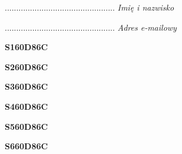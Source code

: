 \begin{turn}{90}\begin{minipage}{\linewidth} \vspace{20mm} ................................................  \textit{Imię i nazwisko}\end{minipage}\end{turn}

\begin{turn}{90}\begin{minipage}{\linewidth} \vspace{20mm} ................................................  \textit{Adres e-mailowy}\end{minipage}\end{turn}

\begin{turn}{90}\huge \begin{minipage}{\linewidth} \vspace{10mm}\textbf{S160D86C}\end{minipage}\end{turn}

\begin{turn}{90}\huge \begin{minipage}{\linewidth} \vspace{10mm}\textbf{S260D86C}\end{minipage}\end{turn}

\begin{turn}{90}\huge \begin{minipage}{\linewidth} \vspace{10mm}\textbf{S360D86C}\end{minipage}\end{turn}

\begin{turn}{90}\huge \begin{minipage}{\linewidth} \vspace{10mm}\textbf{S460D86C}\end{minipage}\end{turn}

\begin{turn}{90}\huge \begin{minipage}{\linewidth} \vspace{10mm}\textbf{S560D86C}\end{minipage}\end{turn}

\begin{turn}{90}\huge \begin{minipage}{\linewidth} \vspace{10mm}\textbf{S660D86C}\end{minipage}\end{turn}

